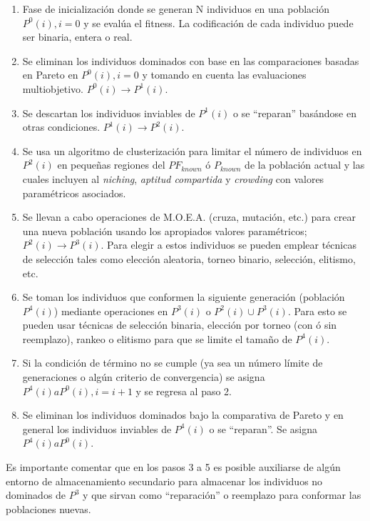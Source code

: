 \documentclass[class=report, crop=false]{standalone}
\begin{document}
\begin{enumerate}
\item Fase de inicialización donde se generan N individuos 
en una población $P^{0}(i), i=0$ y se evalúa el fitness. 
La codificación de cada individuo puede ser binaria, entera 
o real.
\item Se eliminan los individuos dominados con base en las 
comparaciones basadas en Pareto en $P^{0}(i), i=0$ y tomando 
en cuenta las evaluaciones multiobjetivo. $P^{0}(i) \xrightarrow{} P^{1}(i)$.
\item Se descartan los individuos inviables de $P^{1}(i)$ o
 se ``reparan'' basándose en otras condiciones. $P^{1}(i) \xrightarrow{} P^{2}(i)$. 
\item Se usa un algoritmo de clusterización para limitar el 
número de individuos en $P^{2}(i)$ en pequeñas regiones del 
$PF_{known}$ ó $P_{known}$ de la población actual y las cuales 
incluyen al \textit{niching}, \textit{aptitud compartida} 
y \textit{crowding} con valores paramétricos asociados.
\item Se llevan a cabo operaciones de M.O.E.A. (cruza, 
mutación, etc.) para crear una nueva población usando los 
apropiados valores paramétricos; $P^{2}(i) \xrightarrow{} P^{3}(i)$. 
Para elegir a estos individuos se pueden emplear técnicas
de selección tales como elección aleatoria, torneo binario,
selección, elitismo, etc.
\item Se toman los individuos que conformen la siguiente 
generación (población $P^{4}(i)$) mediante operaciones en
$P^{3}(i)$ o $P^{2}(i) \cup P^{3}(i)$. Para esto se pueden
usar técnicas de selección binaria, elección por torneo 
(con ó sin reemplazo), rankeo o elitismo para que se limite
el tamaño de $P^{4}(i)$.
\item Si la condición de término no se cumple (ya sea un
número límite de generaciones o algún criterio de convergencia)
se asigna $P^{4}(i) a P^{0}(i), i=i+1$ y se regresa al paso 2.
\item Se eliminan los individuos dominados bajo la comparativa
de Pareto y en general los individuos inviables de $P^{4}(i)$
o se ``reparan''. Se asigna $P^{4}(i) a P^{0}(i)$.
\end{enumerate}

Es importante comentar que en los pasos 3 a 5 es posible
auxiliarse de algún entorno de almacenamiento secundario para
almacenar los individuos no dominados de $P^{3}$ y que sirvan
como ``reparación'' o reemplazo para conformar las poblaciones
nuevas.
\end{document}
